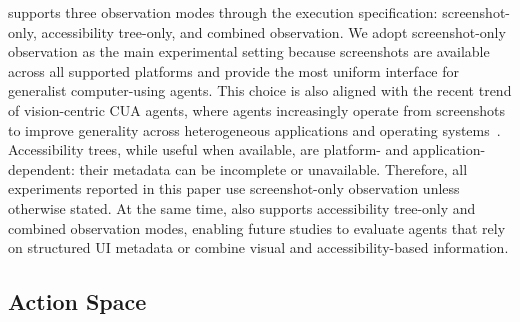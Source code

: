 \dataset supports three observation modes through the execution specification: screenshot-only, accessibility tree-only, and combined observation. We adopt screenshot-only observation as the main experimental setting because screenshots are available across all supported platforms and provide the most uniform interface for generalist computer-using agents. This choice is also aligned with the recent trend of vision-centric CUA agents, where agents increasingly operate from screenshots to improve generality across heterogeneous applications and operating systems~\citep{cheng2024seeclick,wang2024mobile,lu2024omniparser,lin2025showui}. 
Accessibility trees, while useful when available, are platform- and application-dependent: their metadata can be incomplete or unavailable. Therefore, all experiments reported in this paper use screenshot-only observation unless otherwise stated. At the same time, \dataset also supports accessibility tree-only and combined observation modes, enabling future studies to evaluate agents that rely on structured UI metadata or combine visual and accessibility-based information.

\subsection{Action Space}
\label{action_space}


